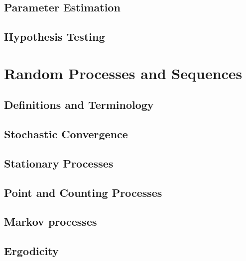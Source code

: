 \documentclass{amro-notes}
\begin{document}
\chapter{Parameter Estimation}


\chapter{Hypothesis Testing}


\part{Random Processes and Sequences}
\chapter{Definitions and Terminology}


\chapter{Stochastic Convergence}


\chapter{Stationary Processes}


\chapter{Point and Counting Processes}


\chapter{Markov processes}


\chapter{Ergodicity}


\begin{appendices}
    
\end{appendices}





\printindex
\end{document}
